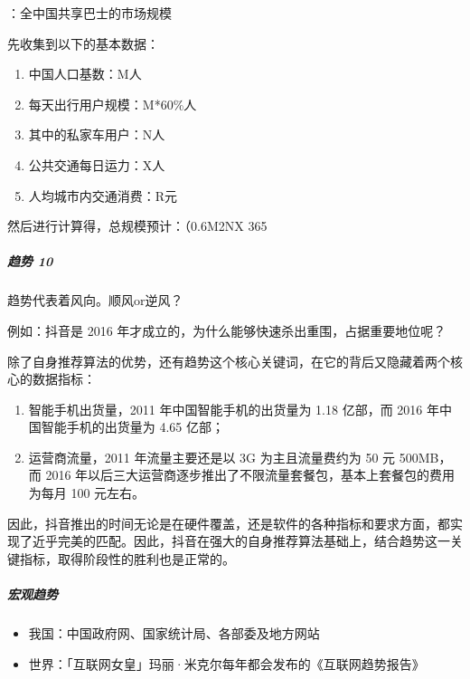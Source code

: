 \documentclass[letterpaper,10pt,english]{sphinxmanual}
\begin{document}
：全中国共享巴士的市场规模

先收集到以下的基本数据：
\begin{enumerate}
%
\item {} 
中国人口基数：M人

\item {} 
每天出行用户规模：M*60\%人

\item {} 
其中的私家车用户：N人

\item {} 
公共交通每日运力：X人

\item {} 
人均城市内交通消费：R元

\end{enumerate}

然后进行计算得，总规模预计：（0.6M\sphinxhyphen{}2N\sphinxhyphen{}X 365


\subparagraph{趋势 10\sphinxfootnotemark[503]}
\label{\detokenize{chapter_knowledge/industry_analysis:id9}}%
\begin{footnotetext}[503]\sphinxAtStartFootnote
{}
%
\end{footnotetext}\ignorespaces 
趋势代表着风向。顺风or逆风？

例如：抖音是 2016 年才成立的，为什么能够快速杀出重围，占据重要地位呢？

除了自身推荐算法的优势，还有趋势这个核心关键词，在它的背后又隐藏着两个核心的数据指标：
\begin{enumerate}
%
\item {} 
智能手机出货量，2011 年中国智能手机的出货量为 1.18 亿部，而 2016
年中国智能手机的出货量为 4.65 亿部；

\item {} 
运营商流量，2011 年流量主要还是以 3G 为主且流量费约为 50 元 500MB，而
2016
年以后三大运营商逐步推出了不限流量套餐包，基本上套餐包的费用为每月
100 元左右。

\end{enumerate}

因此，抖音推出的时间无论是在硬件覆盖，还是软件的各种指标和要求方面，都实现了近乎完美的匹配。因此，抖音在强大的自身推荐算法基础上，结合趋势这一关键指标，取得阶段性的胜利也是正常的。


\subparagraph{宏观趋势}
\label{\detokenize{chapter_knowledge/industry_analysis:id10}}\begin{itemize}
\item {} 
我国：中国政府网、国家统计局、各部委及地方网站

\item {} 
世界：「互联网女皇」玛丽·米克尔每年都会发布的《互联网趋势报告》

\end{itemize}
\end{document}
